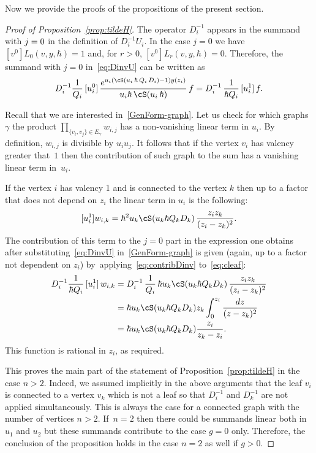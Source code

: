 Now we provide the proofs of the propositions of the present section.
\begin{proof}[Proof of Proposition~\ref{prop:tildeH}]
The operator $D_{i}^{-1}$ appears in the summand with $j=\nobreak0$ in the definition of $D_i^{-1}U_i$. In the case $j=0$ we have $[v^0]L_0(v,y,\hbar)=1$ and, for $r>0$, $[v^0]L_r(v,y,\hbar)=0$. Therefore, the summand with $j=0$ in~\eqref{eq:DinvU} can be written as
\begin{equation}\label{eq:contribDinv}
D_i^{-1}\frac{1}{Q_i}\,
[u_i^0]\, \frac{e^{u_i(\cS(u_i\,\hbar\,Q_i\,D_i)-1)y(z_i)}}{u_i\hbar\,\cS(u_i\,\hbar)}\,f=
D_{i}^{-1}\,\frac{1}{\hbar Q_i}\,[u_i^1]\,f.
\end{equation}

Recall that we are interested in~\eqref{GenForm-graph}.
Let us check for which graphs~$\gamma$ the product $\prod_{\{v_i,v_j\}\in E_\gamma} w_{i,j}$ has a non-vanishing linear term in $u_i$. By definition, $w_{i,j}$ is divisible by $u_iu_j$. It follows that if the vertex $v_i$ has valency greater that~$1$ then the contribution of such graph to the sum has a vanishing linear term in~$u_i$.

If the vertex $i$ has valency 1 and is connected to the vertex $k$ then up to a factor that does not depend on $z_i$ the linear term in $u_i$ is the following:
\begin{equation}\label{eq:cleaf}
[u_i^1]w_{i,k} = \hbar^2 u_k \cS(u_k\hbar Q_kD_k)\,\frac{z_iz_k}{(z_i-z_k)^2}.
\end{equation}
The contribution of this term to the $j=0$ part in the expression one obtains after substituting~\eqref{eq:DinvU} in~\eqref{GenForm-graph} is given (again, up to a factor not dependent on $z_i$) by~applying~\eqref{eq:contribDinv} to~\eqref{eq:cleaf}:
\begin{equation} \label{eq:leafexpr}
\begin{aligned}
D_{i}^{-1}\frac{1}{\hbar Q_i}\,[u_i^1]\,w_{i,k}
&=D_{i}^{-1}\,\frac{1}{Q_i}\,\hbar u_k \cS(u_k\hbar Q_kD_k)\,\frac{z_iz_k}{(z_i-z_k)^2}\\
&=\hbar u_k \cS(u_k\hbar Q_kD_k)z_k\int_0^{z_i}\frac{dz}{(z-z_k)^2}
\\
& =\hbar u_k \cS(u_k\hbar Q_kD_k)\frac{z_i}{z_k-z_i}.
\end{aligned}
\end{equation}
This function is rational in $z_i$, as required.

This proves the main part of the statement of Proposition~\ref{prop:tildeH} in the case $n>2$. Indeed, we assumed implicitly in the above arguments that the leaf $v_i$ is connected to a vertex $v_k$ which is not a leaf so that $D_i^{-1}$ and $D_k^{-1}$ are not applied simultaneously. This is always the case for a connected graph with the number of vertices $n>2$. If~$n=2$ then there could be summands linear both in $u_1$ and $u_2$ but these summands contribute to the case $g=0$ only. Therefore, the conclusion of the proposition holds in the case $n=2$ as well if $g>0$.


\end{proof}
